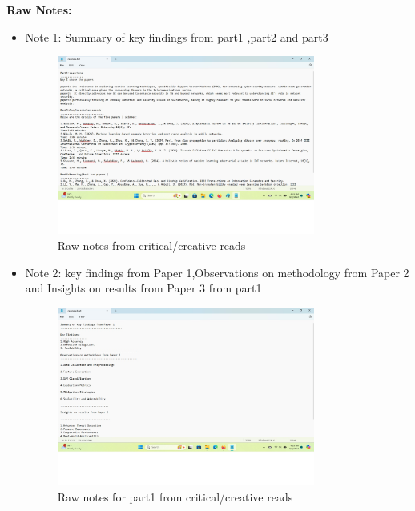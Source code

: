 \documentclass{article}
\begin{document}
\textbf{Raw Notes:}
\begin{itemize}
    \item Note 1: Summary of key findings from part1 ,part2 and part3
    \begin{figure}[ht]
        \centering
        \includegraphics[width=0.8\textwidth]{rawnote1.jpg} %
        \caption{Raw notes from critical/creative reads}
        \label{fig:notes}
    \end{figure}
    \item Note 2: key findings from Paper 1,Observations on methodology from Paper 2 and Insights on results from Paper 3 from part1
    \begin{figure}[ht]
        \centering
        \includegraphics[width=0.8\textwidth]{note2.jpg} %
        \caption{Raw notes for part1 from critical/creative reads}
        \label{fig:notes}
    \end{figure}
    

\end{itemize}
\end{document}
